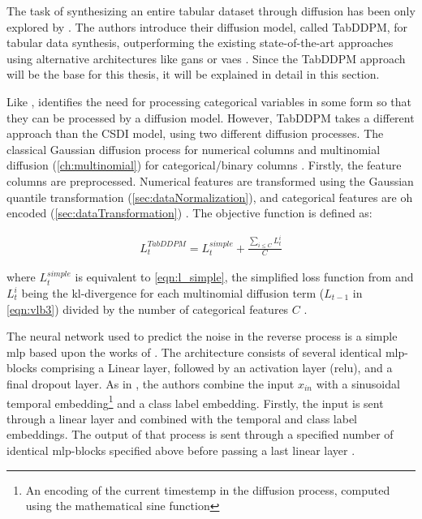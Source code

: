 The task of synthesizing an entire tabular dataset through diffusion has been only explored by \textcite{kotelnikov2022TabDDPMModellingTabular}.
The authors introduce their diffusion model, called TabDDPM, for tabular data synthesis, outperforming the existing state-of-the-art approaches using alternative architectures like \glspl{gan} or \glspl{vae} \cite{kotelnikov2022TabDDPMModellingTabular}. 
Since the TabDDPM approach will be the base for this thesis, it will be explained in detail in this section.

Like \textcite{zheng2022DiffusionModelsMissing}, \textcite{kotelnikov2022TabDDPMModellingTabular} identifies the need for processing categorical variables in some form so that they can be processed by a diffusion model.
However, TabDDPM takes a different approach than the CSDI model, using two different diffusion processes.
The classical Gaussian diffusion process \cite{ho2020DenoisingDiffusionProbabilistic} for numerical columns and multinomial diffusion \cite{hoogeboom2021ArgmaxFlowsMultinomial} (\autoref{ch:multinomial}) for categorical/binary columns \cite{zheng2022DiffusionModelsMissing}.
Firstly, the feature columns are preprocessed.
Numerical features are transformed using the Gaussian quantile transformation (\autoref{sec:dataNormalization}), and categorical features are \gls{oh} encoded (\autoref{sec:dataTransformation}) \cite{kotelnikov2022TabDDPMModellingTabular}.
The objective function is defined as:

\begin{equation}
    \label{eqn:tabddpm_loss}
    \begin{align*}
        L^{TabDDPM}_{t} =L^{simple}_t + \frac{\sum_{i \leq C}^{}L^i_{t}}{C}
    \end{align*}
\end{equation}

where $L^{simple}_t$ is equivalent to \autoref{eqn:l_simple}, the simplified loss function from \textcite{ho2020DenoisingDiffusionProbabilistic} and $L^i_{t}$ being the \gls{kl}-divergence for each multinomial diffusion term ($L_{t-1}$ in \autoref{eqn:vlb3}) divided by the number of categorical features $C$ \cite{kotelnikov2022TabDDPMModellingTabular}.

The neural network used to predict the noise in the reverse process is a simple \gls{mlp} based upon the works of \cite{gorishniy2021RevisitingDeepLearning}.
The architecture consists of several identical \gls{mlp}-blocks comprising a Linear layer, followed by an activation layer (\gls{relu}), and a final dropout layer. 
As in \cite{nichol2021ImprovedDenoisingDiffusion, dhariwal2021DiffusionModelsBeat}, the authors combine the input $x_{in}$ with a sinusoidal temporal embedding\footnote{An encoding of the current timestemp in the diffusion process, computed using the mathematical sine function} and a class label embedding.
Firstly, the input is sent through a linear layer and combined with the temporal and class label embeddings.
The output of that process is sent through a specified number of identical \gls{mlp}-blocks specified above before passing a last linear layer \cite{kotelnikov2022TabDDPMModellingTabular}.

